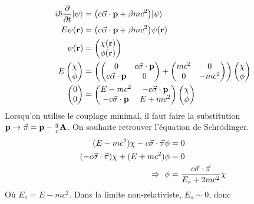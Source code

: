 \begin{align}
    i\hbar\pdv{t} \ket{\psi}&=\qty(c\va{\alpha}\cdot\vb{p}+\beta mc^2)\ket{\psi}\\
    E\psi(\vb{r})&=\qty(c\va{\alpha}\cdot\vb{p}+\beta mc^2)\psi(\vb{r})\\
    \psi(\vb{r})&=
    \begin{pmatrix}
        \chi(\vb{r})\\ \phi(\vb{r})
    \end{pmatrix}\\
    E \begin{pmatrix}
        \chi \\ \phi
    \end{pmatrix} &= \qty(
    \begin{pmatrix}
        0 & c\va{\sigma}\cdot\vb{p}\\
        c\va{\alpha}\cdot\vb{p} & 0
    \end{pmatrix}+
    \begin{pmatrix}
        mc^2 & 0\\ 0 & -mc^2
    \end{pmatrix}
    )\begin{pmatrix}
        \chi\\\phi
    \end{pmatrix}\\
                \begin{pmatrix}
                0 \\ 0
            \end{pmatrix}&=
    \begin{pmatrix}
        E-mc^2 & -c\va{\sigma}\cdot\vb{p}\\
        -c\va{\sigma}\cdot\vb{p} & E+mc^2
    \end{pmatrix}
    \begin{pmatrix}
        \chi \\\phi
    \end{pmatrix}
\end{align}
Lorsqu'on utilise le couplage minimal, il faut faire la substitution
$\vb{p}\rightarrow\va{\pi}=\vb{p}-\frac qc\vb{A}$.
On souhaite retrouver l'équation de Schrödinger.
\begin{align}
    (E-mc^2)\chi-c\va{\sigma}\cdot\va{\pi}\phi&=0\\
    (-c\va{\sigma}\cdot\va{\pi})\chi+(E+mc^2)\phi&=0\\
    \Rightarrow\ \phi&=\frac{c\va{\sigma}\cdot\va{\pi}}{E_s+2mc^2}\chi
\end{align}
Où $E_s=E-mc^2$. Dans la limite non-relativiste, $E_s\sim0$, donc
